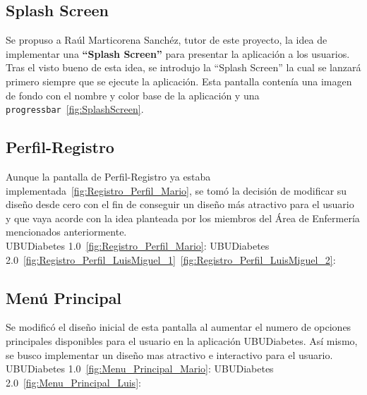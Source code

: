 \subsection{Splash Screen}
Se propuso a Raúl Marticorena Sanchéz, tutor de este proyecto, la idea de implementar una \textbf{``Splash Screen''} para presentar la aplicación a los usuarios. Tras el visto bueno de esta idea, se introdujo la ``Splash Screen'' la cual se lanzará primero siempre que se ejecute la aplicación. Esta pantalla contenía una imagen de fondo con el nombre y color base de la aplicación y una \texttt{progressbar}~\ref{fig:SplashScreen}.

\subsection{Perfil-Registro}
Aunque la pantalla de Perfil-Registro ya estaba implementada~\ref{fig:Registro_Perfil_Mario}, se tomó la decisión de modificar su diseño desde cero con el fin de conseguir un diseño más atractivo para el usuario y que vaya acorde con la idea planteada por los miembros del Área de Enfermería mencionados anteriormente.\\
UBUDiabetes 1.0~\ref{fig:Registro_Perfil_Mario}:
\newpage
UBUDiabetes 2.0~\ref{fig:Registro_Perfil_LuisMiguel_1}~\ref{fig:Registro_Perfil_LuisMiguel_2}:
\newpage
\subsection{Menú Principal}
Se modificó el diseño inicial de esta pantalla al aumentar el numero de opciones principales disponibles para el usuario en la aplicación UBUDiabetes. Así mismo, se busco implementar un diseño mas atractivo e interactivo para el usuario.\\
UBUDiabetes 1.0~\ref{fig:Menu_Principal_Mario}:
UBUDiabetes 2.0~\ref{fig:Menu_Principal_Luis}:
